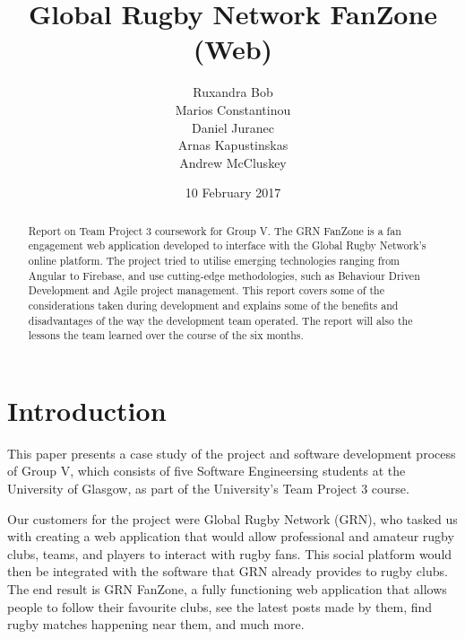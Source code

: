 \documentclass{l3proj}
\begin{document}
\title{Global Rugby Network FanZone (Web)}
\author{Ruxandra Bob \\
		Marios Constantinou \\
        Daniel Juranec \\
        Arnas Kapustinskas \\
        Andrew McCluskey}
\date{10 February 2017}
\maketitle
\begin{abstract}
Report on Team Project 3 coursework for Group V. The GRN FanZone is a
 fan engagement web application developed to interface with the Global Rugby
 Network's online platform. The project tried to utilise
 emerging technologies ranging from Angular to Firebase, and use
 cutting-edge methodologies, such as Behaviour Driven Development and Agile
 project management. This report covers some of the considerations taken
 during development and explains some of the benefits and disadvantages
 of the way the development team operated. The report will also the lessons
 the team learned over the course of the six months.
\end{abstract}
\educationalconsent
\newpage
\tableofcontents
\newpage
\section{Introduction} %

This paper presents a case study of the project and software development process
 of Group V, which consists of five Software Engineersing students at the
 University of Glasgow, as part of the University's Team Project 3 course.

Our customers for the project were Global Rugby Network (GRN), who tasked us
 with creating a web application that would allow professional and amateur
 rugby clubs, teams, and players to interact with rugby fans. This social
 platform would then be integrated with the software that GRN already provides
 to rugby clubs. The end result is GRN FanZone, a fully functioning web application
 that allows people to follow their favourite clubs, see the latest posts
 made by them, find rugby matches happening near them, and much more.
\end{document}
